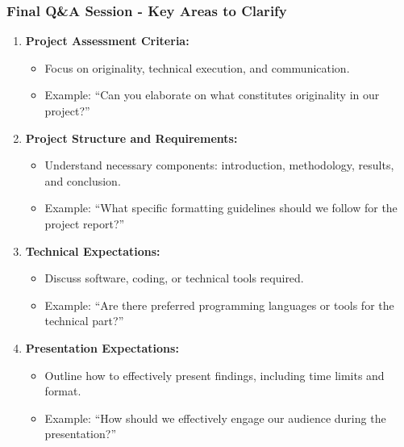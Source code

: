 \documentclass[aspectratio=169]{beamer}
\begin{document}
\begin{frame}[fragile]
    \frametitle{Final Q\&A Session - Key Areas to Clarify}
    \begin{enumerate}
        \item \textbf{Project Assessment Criteria:}
            \begin{itemize}
                \item Focus on originality, technical execution, and communication.
                \item Example: ``Can you elaborate on what constitutes originality in our project?''
            \end{itemize}

        \item \textbf{Project Structure and Requirements:}
            \begin{itemize}
                \item Understand necessary components: introduction, methodology, results, and conclusion.
                \item Example: ``What specific formatting guidelines should we follow for the project report?''
            \end{itemize}

        \item \textbf{Technical Expectations:}
            \begin{itemize}
                \item Discuss software, coding, or technical tools required.
                \item Example: ``Are there preferred programming languages or tools for the technical part?''
            \end{itemize}

        \item \textbf{Presentation Expectations:}
            \begin{itemize}
                \item Outline how to effectively present findings, including time limits and format.
                \item Example: ``How should we effectively engage our audience during the presentation?''
            \end{itemize}
    \end{enumerate}
\end{frame}
\end{document}
